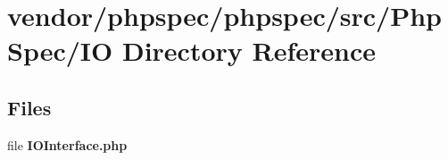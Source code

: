 \section{vendor/phpspec/phpspec/src/\+Php\+Spec/\+I\+O Directory Reference}
\label{dir_67cb82c3c12674a1a122c3c448d637ba}
\subsection*{Files}
\begin{DoxyCompactItemize}
\item 
file {\bf I\+O\+Interface.\+php}
\end{DoxyCompactItemize}
